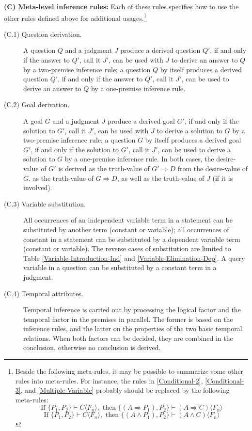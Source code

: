 \textbf{(C) Meta-level inference rules:} Each of these rules specifies how to use the other rules defined above for additional usages.\footnote{Beside the following meta-rules, it may be possible to summarize some other rules into meta-rules. For instance, the rules in \ref{Conditional-2}, \ref{Conditional-3}, and \ref{Multiple-Variable} probably should be replaced by the following meta-rules:
\[\mbox{If } \{P_1, P_2\} \vdash C \langle F_n\rangle , \mbox{ then } \{(A \Rightarrow P_1), P_2\} \vdash (A \Rightarrow C) \langle F_n\rangle \]
\[\mbox{If } \{P_1, P_2\} \vdash C \langle F_n\rangle , \mbox{ then } \{(A \wedge P_1), P_2\} \vdash (A \wedge C) \langle F_n\rangle \]
}
\begin{description}
	\item[(C.1) Question derivation.] A question $Q$ and a judgment $J$ produce a derived question $Q'$, if and only if the answer to $Q'$, call it $J'$, can be used with $J$ to derive an answer to $Q$ by a two-premise inference rule; a question $Q$ by itself produces a derived question $Q'$, if and only if the answer to $Q'$, call it $J'$, can be used to derive an answer to $Q$ by a one-premise inference rule.

  \item[(C.2) Goal derivation.] A goal $G$ and a judgment $J$ produce a derived goal $G'$, if and only if the solution to $G'$, call it $J'$, can be used with $J$ to derive a solution to $G$ by a two-premise inference rule; a question $G$ by itself produces a derived goal $G'$, if and only if the solution to $G'$, call it $J'$, can be used to derive a solution to $G$ by a one-premise inference rule. In both cases, the desire-value of $G'$ is derived as the truth-value of \(G' \Rightarrow D\) from the desire-value of $G$, as the truth-value of \(G \Rightarrow D\), as well as the truth-value of $J$ (if it is involved).

  \item[(C.3) Variable substitution.] All occurrences of an independent variable term in a statement can be substituted by another term (constant or variable); all occurrences of constant in a statement can be substituted by a dependent variable term (constant or variable). The reverse cases of substitution are limited to Table \ref{Variable-Introduction-Ind} and \ref{Variable-Elimination-Dep}. A query variable in a question can be substituted by a constant term in a judgment.

  \item[(C.4) Temporal attributes.] Temporal inference is carried out by processing the logical factor and the temporal factor in the premises in parallel. The former is based on the inference rules, and the latter on the properties of the two basic temporal relations. When both factors can be decided, they are combined in the conclusion, otherwise no conclusion is derived.

\end{description}

